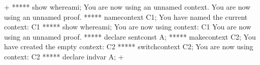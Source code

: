 



\gfexample+
   ***** show whereami;
   You are now using an unnamed context.
   You are now using an unnamed proof.
   ***** namecontext C1;
   You have named the current context: C1
   ***** show whereami;
   You are now using context: C1
   You are now using an unnamed proof.
   ***** declare sentconst A;
   ***** makecontext C2;
   You have created the empty context: C2
   ***** switchcontext C2;
   You are now using context: C2
   ***** declare indvar A;
+